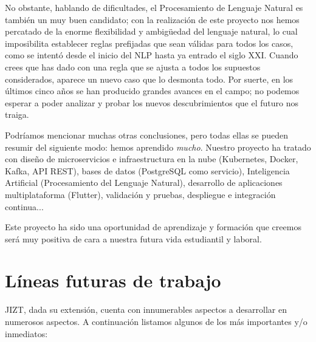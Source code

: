 No obstante, hablando de dificultades, el Procesamiento de Lenguaje Natural es también un muy buen candidato; con la realización de este proyecto nos hemos percatado de la enorme flexibilidad y ambigüedad del lenguaje natural, lo cual imposibilita establecer reglas prefijadas que sean válidas para todos los casos, como se intentó desde el inicio del NLP hasta ya entrado el siglo XXI. Cuando crees que has dado con una regla que se ajusta a todos los supuestos considerados, aparece un nuevo caso que lo desmonta todo. Por suerte, en los últimos cinco años se han producido grandes avances en el campo; no podemos esperar a poder analizar y probar los nuevos descubrimientos que el futuro nos traiga.

Podríamos mencionar muchas otras conclusiones, pero todas ellas se pueden resumir del siguiente modo: hemos aprendido \emph{mucho}. Nuestro proyecto ha tratado con diseño de microservicios e infraestructura en la nube (Kubernetes, Docker, Kafka, API REST), bases de datos (PostgreSQL como servicio), Inteligencia Artificial (Procesamiento del Lenguaje Natural), desarrollo de aplicaciones multiplataforma (Flutter), validación y pruebas, despliegue e integración continua...

Este proyecto ha sido una oportunidad de aprendizaje y formación que creemos será muy positiva de cara a nuestra futura vida estudiantil y laboral.


\section{Líneas futuras de trabajo}

JIZT, dada su extensión, cuenta con innumerables aspectos a desarrollar en numerosos aspectos. A continuación listamos algunos de los más importantes y/o inmediatos:

